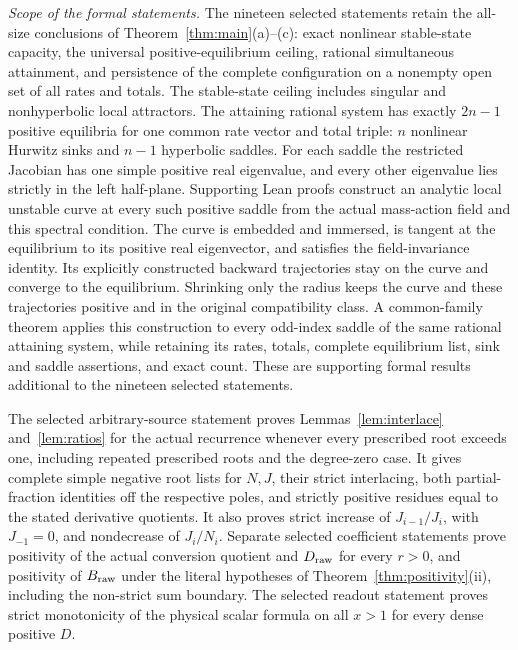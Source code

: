 \emph{Scope of the formal statements.} The nineteen selected statements retain the
all-size conclusions of Theorem~\ref{thm:main}(a)--(c): exact nonlinear stable-state
capacity, the universal positive-equilibrium ceiling, rational simultaneous attainment,
and persistence of the complete configuration on a nonempty open set of all rates and
totals. The stable-state ceiling includes singular and nonhyperbolic local attractors.
The attaining rational system has exactly \(2n-1\) positive equilibria for one common
rate vector and total triple: \(n\) nonlinear Hurwitz sinks and \(n-1\) hyperbolic saddles.
For each saddle the restricted Jacobian has one simple positive real eigenvalue, and every
other eigenvalue lies strictly in the left half-plane. Supporting Lean proofs construct
an analytic local unstable curve at every such positive saddle from the actual mass-action
field and this spectral condition. The curve is embedded and immersed, is tangent at the
equilibrium to its positive real eigenvector, and satisfies the field-invariance identity.
Its explicitly constructed backward trajectories stay on the curve and converge to the
equilibrium. Shrinking only the radius keeps the curve and these trajectories positive
and in the original compatibility class. A common-family theorem applies this construction
to every odd-index saddle of the same rational attaining system, while retaining its rates,
totals, complete equilibrium list, sink and saddle assertions, and exact count.
These are supporting formal results additional to the nineteen selected statements.

The selected arbitrary-source statement proves Lemmas~\ref{lem:interlace}
and~\ref{lem:ratios} for the actual recurrence whenever every prescribed root exceeds one,
including repeated prescribed roots and the degree-zero case. It gives complete simple
negative root lists for \(N,J\), their strict interlacing, both partial-fraction identities
off the respective poles, and strictly positive residues equal to the stated derivative
quotients. It also proves strict increase of \(J_{i-1}/J_i\), with \(J_{-1}=0\), and
nondecrease of \(J_i/N_i\). Separate selected coefficient statements prove positivity of
the actual conversion quotient and \(D_{\mathrm{raw}}\) for every \(r>0\), and positivity of
\(B_{\mathrm{raw}}\) under the literal hypotheses of Theorem~\ref{thm:positivity}(ii), including
the non-strict sum boundary. The selected readout statement proves strict monotonicity of
the physical scalar formula on all \(x>1\) for every dense positive \(D\).

